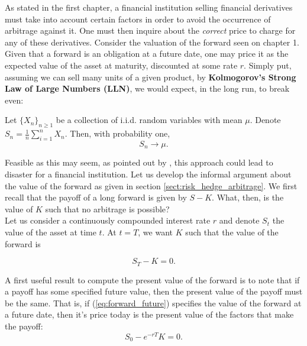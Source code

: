 \documentclass[../TGMAFFIRO.tex]{subfiles}
\begin{document}
As stated in the first chapter, a financial institution selling financial derivatives must take into account certain factors in order to avoid the occurrence of arbitrage against it. One must then inquire about the \textit{correct} price to charge for any of these derivatives. Consider the valuation of the forward seen on chapter 1. Given that a forward is an obligation at a future date, one may price it as the expected value of the asset at maturity, discounted at some rate $r$. Simply put, assuming we can sell many units of a given product, by \textbf{Kolmogorov's Strong Law of Large Numbers (LLN)}, we would expect, in the long run, to break even:

\begin{theorem}
    Let $\{X_n\}_{n\geq 1}$ be a collection of i.i.d. random variables with mean $\mu$. Denote $S_n = \frac{1}{n}\sum_{i=1}^n X_n$. Then, with probability one,
    \begin{equation}
        S_n \to \mu.
    \end{equation}
\end{theorem}

Feasible as this may seem, as pointed out by , this approach could lead to disaster for a financial institution. Let us develop the informal argument about the value of the forward as given in section \ref{sect:risk_hedge_arbitrage}. We first recall that the payoff of a long forward is given by $S - K$. What, then, is the value of $K$ such that no arbitrage is possible?\\

Let us consider a continuously compounded interest rate $r$ and denote $S_t$ the value of the asset at time $t$. At $t=T$, we want $K$ such that the value of the forward is

\begin{equation}\label{eq:forward_future}
  S_T - K = 0.
\end{equation}

A first useful result to compute the present value of the forward is to note that if a payoff has some specified future value, then the present value of the payoff must be the same. That is,
if (\ref{eq:forward_future}) specifies the value of the forward at a future date, then it's price today is the present value of the factors that make the payoff:
\begin{equation}
  S_0 - e^{-rT}K = 0.
\end{equation}
\end{document}
